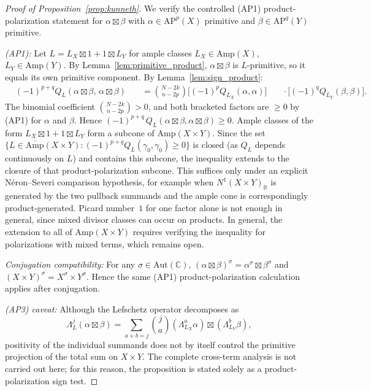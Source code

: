 \documentclass[aps,prd,twocolumn,superscriptaddress,nofootinbib]{revtex4-2}
\theoremstyle{definition}
\theoremstyle{remark}
\def\\{ }%
\begin{document}
\begin{proof}[Proof of Proposition~\ref{prop:kunneth}]
We verify the controlled (AP1) product-polarization statement for $\alpha \boxtimes \beta$ with $\alpha \in \mathrm{AP}^p(X)$ primitive and $\beta \in \mathrm{AP}^q(Y)$ primitive.

\textit{(AP1):} Let $L = L_X \boxtimes 1 + 1 \boxtimes L_Y$ for ample classes $L_X \in \mathrm{Amp}(X)$, $L_Y \in \mathrm{Amp}(Y)$. By Lemma~\ref{lem:primitive_product}, $\alpha \boxtimes \beta$ is $L$-primitive, so it equals its own primitive component. By Lemma~\ref{lem:sign_product}:
\[
\begin{aligned}
&(-1)^{p+q} Q_L(\alpha \boxtimes \beta,\, \alpha \boxtimes \beta)\\
&\quad= \binom{N-2k}{n-2p}
   \bigl[(-1)^p Q_{L_X}(\alpha, \alpha)\bigr]\\
&\quad\cdot \bigl[(-1)^q Q_{L_Y}(\beta, \beta)\bigr].
\end{aligned}
\]
The binomial coefficient $\binom{N-2k}{n-2p} > 0$, and both bracketed factors are $\geq 0$ by (AP1) for $\alpha$ and $\beta$. Hence $(-1)^{p+q}\, Q_L(\alpha \boxtimes \beta, \alpha \boxtimes \beta) \geq 0$. Ample classes of the form $L_X \boxtimes 1 + 1 \boxtimes L_Y$ form a subcone of $\mathrm{Amp}(X \times Y)$. Since the set $\{L \in \overline{\mathrm{Amp}}(X \times Y) : (-1)^{p+q} Q_L(\gamma_0, \gamma_0) \geq 0\}$ is closed (as $Q_L$ depends continuously on $L$) and contains this subcone, the inequality extends to the closure of that product-polarization subcone. This suffices only under an explicit Néron--Severi comparison hypothesis, for example when $N^1(X\times Y)_\mathbb{R}$ is generated by the two pullback summands and the ample cone is correspondingly product-generated. Picard number~$1$ for one factor alone is not enough in general, since mixed divisor classes can occur on products. In general, the extension to all of $\mathrm{Amp}(X \times Y)$ requires verifying the inequality for polarizations with mixed terms, which remains open.

\textit{Conjugation compatibility:} For any $\sigma \in \mathrm{Aut}(\mathbb{C})$, $(\alpha \boxtimes \beta)^\sigma = \alpha^\sigma \boxtimes \beta^\sigma$ and $(X \times Y)^\sigma = X^\sigma \times Y^\sigma$. Hence the same (AP1) product-polarization calculation applies after conjugation.

\textit{(AP3) caveat:} Although the Lefschetz operator decomposes as
\[
\Lambda_L^j(\alpha \boxtimes \beta) = \sum_{a+b=j} \binom{j}{a}(\Lambda_{L_X}^a\alpha)\boxtimes(\Lambda_{L_Y}^b\beta),
\]
positivity of the individual summands does not by itself control the primitive projection of the total sum on $X\times Y$. The complete cross-term analysis is not carried out here; for this reason, the proposition is stated solely as a product-polarization sign test.
\end{proof}
\end{document}
